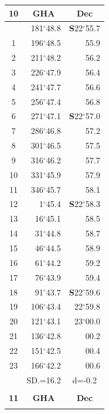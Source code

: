 \documentclass[10pt, a4paper]{report}
\begin{document}
\begin{scriptsize}
\begin{tabular*}{0.2\textwidth}[t]{@{\extracolsep{\fill}}|c|rr|}
\hline
\multicolumn{1}{|c|}{\rule{0pt}{2.6ex}\textbf{10}} & \multicolumn{1}{c}{\textbf{GHA}} & \multicolumn{1}{c|}{\textbf{Dec}}\\
\hline\rule{0pt}{2.6ex}\noindent
0 & 181$^\circ$48.8 & \textbf{S}22$^\circ$55.7\\
1 & 196$^\circ$48.5 & 55.9\\
2 & 211$^\circ$48.2 & 56.2\\
3 & 226$^\circ$47.9 & \raisebox{0.24ex}{\boldmath$\cdot$~\boldmath$\cdot$~~}56.4\\
4 & 241$^\circ$47.7 & 56.6\\
5 & 256$^\circ$47.4 & 56.8\\[2Pt]
6 & 271$^\circ$47.1 & \textbf{S}22$^\circ$57.0\\
7 & 286$^\circ$46.8 & 57.2\\
8 & 301$^\circ$46.5 & 57.5\\
9 & 316$^\circ$46.2 & \raisebox{0.24ex}{\boldmath$\cdot$~\boldmath$\cdot$~~}57.7\\
10 & 331$^\circ$45.9 & 57.9\\
11 & 346$^\circ$45.7 & 58.1\\[2Pt]
12 & 1$^\circ$45.4 & \textbf{S}22$^\circ$58.3\\
13 & 16$^\circ$45.1 & 58.5\\
14 & 31$^\circ$44.8 & 58.7\\
15 & 46$^\circ$44.5 & \raisebox{0.24ex}{\boldmath$\cdot$~\boldmath$\cdot$~~}58.9\\
16 & 61$^\circ$44.2 & 59.2\\
17 & 76$^\circ$43.9 & 59.4\\[2Pt]
18 & 91$^\circ$43.7 & \textbf{S}22$^\circ$59.6\\
19 & 106$^\circ$43.4 & 22$^\circ$59.8\\
20 & 121$^\circ$43.1 & 23$^\circ$00.0\\
21 & 136$^\circ$42.8 & \raisebox{0.24ex}{\boldmath$\cdot$~\boldmath$\cdot$~~}00.2\\
22 & 151$^\circ$42.5 & 00.4\\
23 & 166$^\circ$42.2 & 00.6\\
\hline
\rule{0pt}{2.4ex} & \multicolumn{1}{c}{SD.=16.2} & \multicolumn{1}{c|}{d=-0.2}\\
\hline
\multicolumn{1}{c}{}\\[-0.5ex]\hline
\multicolumn{1}{|c|}{\rule{0pt}{2.6ex}\textbf{11}} & \multicolumn{1}{c}{\textbf{GHA}} & \multicolumn{1}{c|}{\textbf{Dec}}\\
\hline\rule{0pt}{2.6ex}\noindent

\end{tabular*}
\end{scriptsize}
\end{document}
